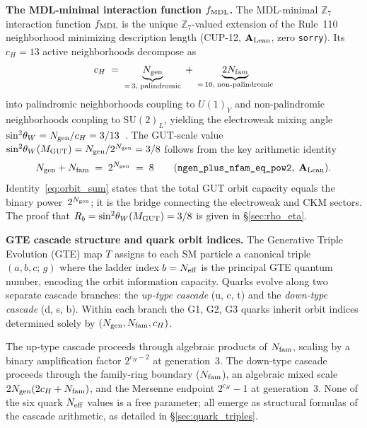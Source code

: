 \documentclass[11pt]{article}
\theoremstyle{remark}
\newcommand{\Ngen}{N_{\rm gen}}
\newcommand{\Nfam}{N_{\rm fam}}
\newcommand{\cH}{c_H}
\newcommand{\lean}[1]{%
  \penalty-100
  \begingroup\def\_{\textunderscore\allowbreak}\texttt{#1}\endgroup}
\newcommand{\Rb}{R_b}
\newcommand{\sinwsq}{\sin^2\!\theta_W}
\newcommand{\CatAL}{\ensuremath{\textbf{A}_{\rm Lean}}}
\begin{document}
\medskip

\textbf{The MDL-minimal interaction function $f_{\rm MDL}$.}
The MDL-minimal $\mathbb{Z}_7$ interaction function $f_{\rm MDL}$ is the unique
$\mathbb{Z}_7$-valued extension of the Rule~110 neighborhood minimizing description
length (CUP-12, $\CatAL$, zero \texttt{sorry}).
Its $\cH = 13$ active neighborhoods decompose as
\[
  \cH \;=\;
  \underbrace{\Ngen}_{=\,3,\;\text{palindromic}} \;+\;
  \underbrace{2\Nfam}_{=\,10,\;\text{non-palindromic}}
\]
into palindromic neighborhoods coupling to $U(1)_Y$ and non-palindromic neighborhoods
coupling to $\mathrm{SU}(2)_L$, yielding the electroweak mixing angle
$\sinwsq = \Ngen/\cH = 3/13$~\cite{SpivackWeinberg}.
The GUT-scale value $\sinwsq(M_{\rm GUT}) = \Ngen/2^{\Ngen} = 3/8$ follows from the
key arithmetic identity
\begin{equation}\label{eq:orbit_sum}
  \Ngen + \Nfam \;=\; 2^{\Ngen} \;=\; 8
  \qquad (\lean{ngen\_plus\_nfam\_eq\_pow2},\;\CatAL).
\end{equation}
Identity~\eqref{eq:orbit_sum} states that the total GUT orbit capacity equals the
binary power~$2^{\Ngen}$; it is the bridge connecting the electroweak and CKM sectors.
The proof that $\Rb = \sinwsq(M_{\rm GUT}) = 3/8$ is given in \S\ref{sec:rho_eta}.

\medskip

\textbf{GTE cascade structure and quark orbit indices.}
The Generative Triple Evolution (GTE) map $T$ assigns to each SM particle a canonical
triple $(a, b, c;\,g)$ where the ladder index $b = N_{\rm eff}$ is the principal GTE
quantum number, encoding the orbit information capacity.
Quarks evolve along two separate cascade branches: the \emph{up-type cascade} (u, c, t)
and the \emph{down-type cascade} (d, s, b).
Within each branch the G1, G2, G3 quarks inherit orbit indices determined solely by
$(\Ngen, \Nfam, \cH)$.

\medskip

The up-type cascade proceeds through algebraic products of $\Nfam$, scaling by a binary
amplification factor $2^{\cH-2}$ at generation~3.
The down-type cascade proceeds through the family-ring boundary ($\Nfam$), an algebraic
mixed scale $2\Ngen(2\cH+\Nfam)$, and the Mersenne endpoint $2^{\cH}-1$ at generation~3.
None of the six quark $N_{\rm eff}$ values is a free parameter; all emerge as structural
formulas of the cascade arithmetic, as detailed in \S\ref{sec:quark_triples}.

\end{document}
